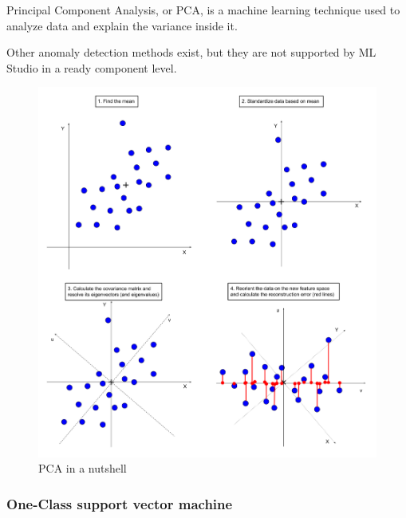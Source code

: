 Principal Component Analysis, or PCA,
is a machine learning technique
used to analyze data and explain the variance inside it.~\cite{azure2022pca}



Other anomaly detection methods exist, but they are not supported by ML Studio
in a ready component level. %

\begin{figure}[htb]
    \centering
    \includegraphics[width=150mm]{./appendices/pca-nutshell}
    \caption{PCA in a nutshell
        \label{fig:pca-nutshell}}
\end{figure}


\subsubsection*{One-Class support vector machine}

